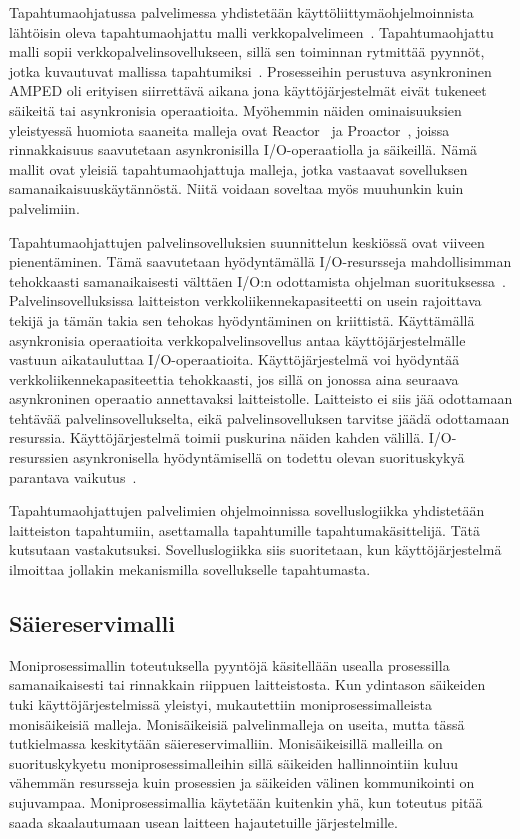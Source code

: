 \documentclass[finnish]{tktltiki2}%
\theoremstyle{definition}
\theoremstyle{remark}
\begin{document}
Tapahtumaohjatussa palvelimessa yhdistetään
käyttöliittymäohjelmoinnista lähtöisin oleva tapahtumaohjattu malli
verkkopalvelimeen~\cite{pai_flash_1999}. Tapahtumaohjattu malli sopii verkkopalvelinsovellukseen,
sillä sen toiminnan rytmittää pyynnöt, jotka
kuvautuvat mallissa tapahtumiksi~\cite{schmidt_reactor:_1995}.
Prosesseihin perustuva asynkroninen AMPED\cite{pai_flash_1999}
oli erityisen siirrettävä aikana jona käyttöjärjestelmät
eivät tukeneet säikeitä tai asynkronisia operaatioita.
Myöhemmin näiden ominaisuuksien yleistyessä
huomiota saaneita malleja ovat Reactor~\cite{schmidt_reactor:_1995}
ja Proactor~\cite{hu_applying_1998}, joissa
rinnakkaisuus saavutetaan asynkronisilla I/O-operaatiolla
ja säikeillä. Nämä mallit ovat yleisiä tapahtumaohjattuja malleja, jotka
vastaavat sovelluksen samanaikaisuuskäytännöstä.
Niitä voidaan soveltaa myös muuhunkin kuin palvelimiin.


Tapahtumaohjattujen palvelinsovelluksien suunnittelun keskiössä
ovat viiveen pienentäminen.
Tämä saavutetaan hyödyntämällä I/O-resursseja mahdollisimman tehokkaasti
samanaikaisesti välttäen I/O:n odottamista ohjelman suorituksessa~\cite{pai_flash_1999}.
Palvelinsovelluksissa
laitteiston verkkoliikennekapasiteetti on usein rajoittava tekijä ja tämän takia
sen tehokas hyödyntäminen on kriittistä.
Käyttämällä asynkronisia operaatioita verkkopalvelinsovellus
antaa käyttöjärjestelmälle vastuun aikatauluttaa I/O-operaatioita.
Käyttöjärjestelmä voi hyödyntää verkkoliikennekapasiteettia
tehokkaasti, jos sillä on jonossa aina seuraava asynkroninen operaatio
annettavaksi laitteistolle. Laitteisto ei siis jää odottamaan tehtävää
palvelinsovellukselta, eikä palvelinsovelluksen tarvitse jäädä
odottamaan resurssia. Käyttöjärjestelmä toimii
puskurina näiden kahden välillä.
I/O-resurssien asynkronisella hyödyntämisellä on todettu
olevan suorituskykyä parantava vaikutus~\cite{hu_applying_1998}.

Tapahtumaohjattujen palvelimien ohjelmoinnissa sovelluslogiikka yhdistetään
laitteiston tapahtumiin, asettamalla tapahtumille tapahtumakäsittelijä.
Tätä kutsutaan vastakutsuksi. Sovelluslogiikka siis suoritetaan, kun
käyttöjärjestelmä ilmoittaa jollakin mekanismilla sovellukselle tapahtumasta.


\subsection{Säiereservimalli}
Moniprosessimallin toteutuksella pyyntöjä käsitellään
usealla prosessilla samanaikaisesti tai rinnakkain riippuen laitteistosta.
Kun ydintason säikeiden tuki käyttöjärjestelmissä yleistyi, mukautettiin
moniprosessimalleista monisäikeisiä malleja.
Monisäikeisiä palvelinmalleja on useita, mutta tässä tutkielmassa keskitytään säiereservimalliin.
Monisäikeisillä malleilla on suorituskykyetu moniprosessimalleihin sillä säikeiden
hallinnointiin
kuluu vähemmän resursseja kuin prosessien ja säikeiden välinen kommunikointi on sujuvampaa.
Moniprosessimallia käytetään kuitenkin yhä, kun toteutus pitää
saada skaalautumaan usean laitteen hajautetuille järjestelmille.
\end{document}
